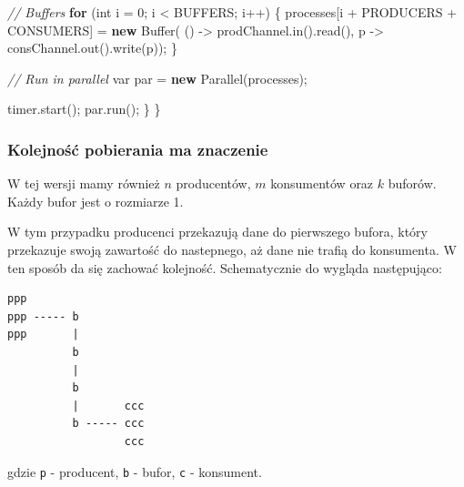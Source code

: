 \documentclass[11pt]{article}
\newenvironment{Shaded}{}{}
\newcommand{\KeywordTok}[1]{\textcolor[rgb]{0.00,0.44,0.13}{\textbf{{#1}}}}
\newcommand{\DataTypeTok}[1]{\textcolor[rgb]{0.56,0.13,0.00}{{#1}}}
\newcommand{\DecValTok}[1]{\textcolor[rgb]{0.25,0.63,0.44}{{#1}}}
\newcommand{\CommentTok}[1]{\textcolor[rgb]{0.38,0.63,0.69}{\textit{{#1}}}}
\newcommand{\FunctionTok}[1]{\textcolor[rgb]{0.02,0.16,0.49}{{#1}}}
\newcommand{\NormalTok}[1]{{#1}}
\newcommand{\ControlFlowTok}[1]{\textcolor[rgb]{0.00,0.44,0.13}{\textbf{{#1}}}}
\newcommand{\OperatorTok}[1]{\textcolor[rgb]{0.40,0.40,0.40}{{#1}}}
\newcommand{\BuiltInTok}[1]{{#1}}
\begin{document}
\begin{Shaded}
\begin{Highlighting}[]
        \CommentTok{// Buffers}
        \ControlFlowTok{for} \OperatorTok{(}\DataTypeTok{int}\NormalTok{ i }\OperatorTok{=} \DecValTok{0}\OperatorTok{;}\NormalTok{ i }\OperatorTok{\textless{}}\NormalTok{ BUFFERS}\OperatorTok{;}\NormalTok{ i}\OperatorTok{++)} \OperatorTok{\{}
\NormalTok{            processes}\OperatorTok{[}\NormalTok{i }\OperatorTok{+}\NormalTok{ PRODUCERS }\OperatorTok{+}\NormalTok{ CONSUMERS}\OperatorTok{]} \OperatorTok{=} \KeywordTok{new} \BuiltInTok{Buffer}\OperatorTok{(}
                    \OperatorTok{()} \OperatorTok{{-}\textgreater{}}\NormalTok{ prodChannel}\OperatorTok{.}\FunctionTok{in}\OperatorTok{().}\FunctionTok{read}\OperatorTok{(),}
\NormalTok{                    p }\OperatorTok{{-}\textgreater{}}\NormalTok{ consChannel}\OperatorTok{.}\FunctionTok{out}\OperatorTok{().}\FunctionTok{write}\OperatorTok{(}\NormalTok{p}\OperatorTok{));}
        \OperatorTok{\}}

        \CommentTok{// Run in parallel}
        \DataTypeTok{var}\NormalTok{ par }\OperatorTok{=} \KeywordTok{new} \FunctionTok{Parallel}\OperatorTok{(}\NormalTok{processes}\OperatorTok{);}

\NormalTok{        timer}\OperatorTok{.}\FunctionTok{start}\OperatorTok{();}
\NormalTok{        par}\OperatorTok{.}\FunctionTok{run}\OperatorTok{();}
    \OperatorTok{\}}
\OperatorTok{\}}
\end{Highlighting}
\end{Shaded}

    \hypertarget{kolejnoux15bux107-pobierania-ma-znaczenie}{%
\subsubsection{Kolejność pobierania ma
znaczenie}\label{kolejnoux15bux107-pobierania-ma-znaczenie}}

W tej wersji mamy również \(n\) producentów, \(m\) konsumentów oraz
\(k\) buforów. Każdy bufor jest o rozmiarze 1.

W tym przypadku producenci przekazują dane do pierwszego bufora, który
przekazuje swoją zawartość do nastepnego, aż dane nie trafią do
konsumenta. W ten sposób da się zachować kolejność. Schematycznie do
wygląda następująco:

\begin{verbatim}
ppp
ppp ----- b
ppp       |
          b
          |
          b
          |       ccc
          b ----- ccc
                  ccc
\end{verbatim}

gdzie \texttt{p} - producent, \texttt{b} - bufor, \texttt{c} -
konsument.
\end{document}
